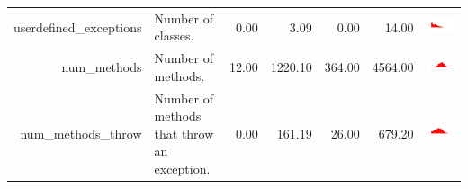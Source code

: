\begin{table}[ht]
\begin{tabular}{rp{16em}rrrrc}
  userdefined\_exceptions & Number of classes. & 0.00 & 3.09 & 0.00 & 14.00 & \includegraphics[scale = 0.1, clip = true, trim= 50px 60px 50px 60px]{hist-135e03395e7521809f10de2e03c70b19.pdf} \\ 
  num\_methods & Number of methods. & 12.00 & 1220.10 & 364.00 & 4564.00 & \includegraphics[scale = 0.1, clip = true, trim= 50px 60px 50px 60px]{hist-b6b0d4aa4024bfd6f76543e50b59b4a4.pdf} \\ 
  num\_methods\_throw & Number of methods that throw an exception. & 0.00 & 161.19 & 26.00 & 679.20 & \includegraphics[scale = 0.1, clip = true, trim= 50px 60px 50px 60px]{hist-762ba48e13fc4bdec8910cf5d8e488c1.pdf} \\ 

\end{tabular}
\end{table}

